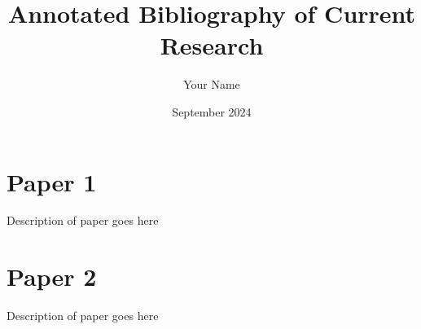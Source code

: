\documentclass[12pt]{article}
\title{Annotated Bibliography of Current Research}
\author{Your Name}
\date{September 2024}
\begin{document}
\maketitle

\section{Paper 1}
Description of paper goes here

\section{Paper 2}
Description of paper goes here
\end{document}
